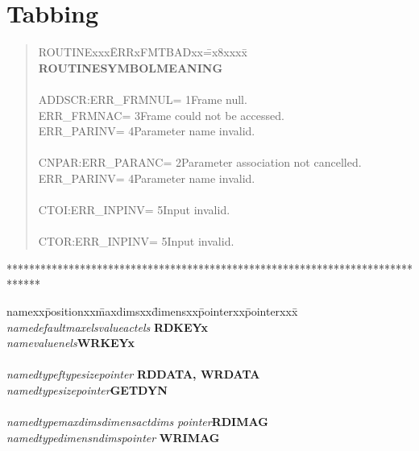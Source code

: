 \documentclass[twoside,11pt]{starlink}
\begin{document}
\section{Tabbing}

\begin{terminalv}
\begin{quote}
  \begin{tabbing}
    ROUTINExxx\=ERRxFMTBADxx\==x8xxxx\=\kill
    \textbf{ROUTINE}\>\textbf{SYMBOL}\>\>\textbf{MEANING}\\
    \\
    ADDSCR:\>ERR\_FRMNUL\>= 1\>Frame null.\\
    \>ERR\_FRMNAC\>= 3\>Frame could not be accessed.\\
    \>ERR\_PARINV\>= 4\>Parameter name invalid.\\
    \\
    CNPAR:\>ERR\_PARANC\>= 2\>Parameter association not cancelled.\\
    \>ERR\_PARINV\>= 4\>Parameter name invalid.\\
    \\
    CTOI:\>ERR\_INPINV\>= 5\>Input invalid.\\
    \\
    CTOR:\>ERR\_INPINV\>= 5\>Input invalid.\\
  \end{tabbing}
\end{quote}

******************************************************************************

\begin{tabbing}
  namexx\=positionxx\=maxdimsxx\=dimensxx\=pointerxx\=pointerxxx\=\kill
  \emph{name}\>\emph{default}\>\emph{maxels}\>\emph{value}\>\emph{actels}
    \>\>\textbf{RDKEYx}\\
  \emph{name}\>\>\>\emph{value}\>\emph{nels}\>\>\textbf{WRKEYx}\\
  \\
  \emph{name}\>\emph{dtype}\>\emph{ftype}\>\emph{size}\>\emph{pointer}
    \>\>\textbf{RDDATA, WRDATA}\\
  \emph{name}\>\emph{dtype}\>\>\emph{size}\>\emph{pointer}\>\>\textbf{GETDYN}\\
  \\
  \emph{name}\>\emph{dtype}\>\emph{maxdims}\>\emph{dimens}\>\emph{actdims}
    \>\emph{pointer}\>\textbf{RDIMAG}\\
  \emph{name}\>\emph{dtype}\>\>\emph{dimens}\>\emph{ndims}\>\emph{pointer}
    \>\textbf{WRIMAG}\\
\end{tabbing}
\end{terminalv}
\end{document}
